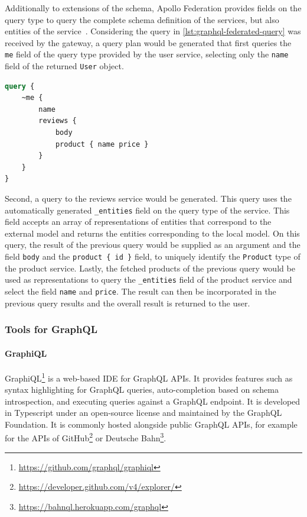 Additionally to extensions of the schema, Apollo Federation provides fields on the query type to query the complete schema definition of the services, but also entities of the service~\cite{MDGa}.
Considering the query in \autoref{lst:graphql-federated-query} was received by the gateway, a query plan would be generated that first queries the \texttt{me} field of the query type provided by the user service, selecting only the \texttt{name} field of the returned \texttt{User} object.

\begin{lstlisting}[caption={Query to a Federated GraphQL \acs{API}~\cite{MDG}}, language=graphql, label={lst:graphql-federated-query}]
query {
    ~me {
        name
        reviews {
            body
            product { name price }
        }
    }
}
\end{lstlisting}

Second, a query to the reviews service would be generated.
This query uses the automatically generated \texttt{\_entities} field on the query type of the service.
This field accepts an array of representations of entities that correspond to the external model and returns the entities corresponding to the local model.
On this query, the result of the previous query would be supplied as an argument and the field \texttt{body} and the \texttt{product \{ id \}} field, to uniquely identify the \texttt{Product} type of the product service.
Lastly, the fetched products of the previous query would be used as representations to query the \texttt{\_entities} field of the product service and select the field \texttt{name} and \texttt{price}.
The result can then be incorporated in the previous query results and the overall result is returned to the user.

\subsubsection{Tools for GraphQL}\label{sec:graphql-tools}


\paragraph{GraphiQL}

GraphiQL\footnote{\url{https://github.com/graphql/graphiql}} is a web-based \ac{IDE} for GraphQL \acp{API}.
It provides features such as syntax highlighting for GraphQL queries, auto-completion based on schema introspection, and executing queries against a GraphQL endpoint.
It is developed in Typescript under an open-source license and maintained by the GraphQL Foundation.
It is commonly hosted alongside public GraphQL \acp{API}, for example for the \acp{API} of GitHub\footnote{\url{https://developer.github.com/v4/explorer/}} or Deutsche Bahn\footnote{\url{https://bahnql.herokuapp.com/graphql}}.


